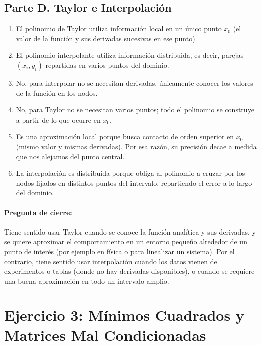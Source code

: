 \documentclass[11pt,a4paper]{article}
\begin{document}
\subsection{Parte D. Taylor e Interpolación}
\begin{enumerate}[label=\alph*), leftmargin=*]
    \item El polinomio de Taylor utiliza información local en un único punto $x_0$ (el valor de la función y sus derivadas sucesivas en ese punto).
    \item El polinomio interpolante utiliza información distribuida, es decir, parejas $(x_i, y_i)$ repartidas en varios puntos del dominio.
    \item No, para interpolar no se necesitan derivadas, únicamente conocer los valores de la función en los nodos.
    \item No, para Taylor no se necesitan varios puntos; todo el polinomio se construye a partir de lo que ocurre en $x_0$.
    \item Es una aproximación local porque busca contacto de orden superior en $x_0$ (mismo valor y mismas derivadas). Por esa razón, su precisión decae a medida que nos alejamos del punto central.
    \item La interpolación es distribuida porque obliga al polinomio a cruzar por los nodos fijados en distintos puntos del intervalo, repartiendo el error a lo largo del dominio.
\end{enumerate}

\paragraph{Pregunta de cierre:}
Tiene sentido usar Taylor cuando se conoce la función analítica y sus derivadas, y se quiere aproximar el comportamiento en un entorno pequeño alrededor de un punto de interés (por ejemplo en física o para linealizar un sistema). Por el contrario, tiene sentido usar interpolación cuando los datos vienen de experimentos o tablas (donde no hay derivadas disponibles), o cuando se requiere una buena aproximación en todo un intervalo amplio.

\section{Ejercicio 3: Mínimos Cuadrados y Matrices Mal Condicionadas}
\end{document}
